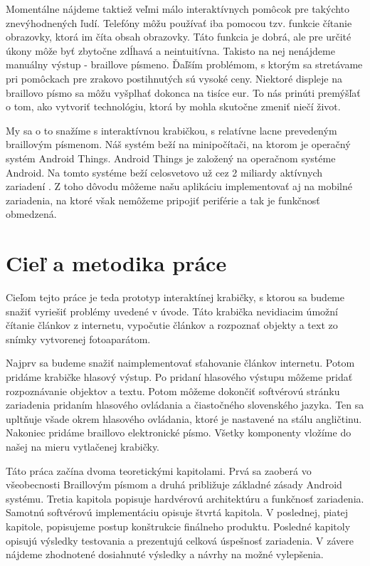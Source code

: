 \documentclass{template/socthesis}
\begin{document}
Momentálne nájdeme taktiež veľmi málo interaktívnych pomôcok pre takýchto znevýhodnených ľudí. Telefóny môžu používať iba pomocou tzv. funkcie čítanie obrazovky, ktorá im číta obsah obrazovky. Táto funkcia je dobrá, ale pre určité úkony môže byť zbytočne zdĺhavá a neintuitívna. Takisto na nej nenájdeme manuálny výstup - braillove písmeno. Ďaľším problémom, s ktorým sa stretávame pri pomôckach pre zrakovo postihnutých sú vysoké ceny. Niektoré displeje na braillovo písmo sa môžu vyšplhať dokonca na tisíce eur. To nás prinúti premýšľať o tom, ako vytvoriť technológiu, ktorá by mohla skutočne zmeniť niečí život.
	
My sa o to snažíme s interaktívnou krabičkou, s relatívne lacne prevedeným braillovým písmenom. Náš systém beží na minipočítači, na ktorom je operačný systém Android Things. Android Things je založený na operačnom systéme Android. Na tomto systéme beží celosvetovo už cez 2 miliardy aktívnych zariadení \cite{ng_2017}. Z toho dôvodu môžeme našu aplikáciu implementovať aj na mobilné zariadenia, na ktoré však nemôžeme pripojiť periférie a tak je funkčnosť obmedzená.
\newpage


\chapter*{Cieľ a metodika práce}
Cieľom tejto práce je teda prototyp interaktínej krabičky, s ktorou sa budeme snažiť vyriešiť problémy uvedené v úvode. Táto krabička nevidiacim úmožní čítanie článkov z internetu, vypočutie článkov a rozpoznať objekty a text zo snímky vytvorenej fotoaparátom.

Najprv sa budeme snažiť naimplementovať sťahovanie článkov internetu. 
Potom pridáme krabičke hlasový výstup. Po pridaní hlasového výstupu môžeme pridať rozpoznávanie objektov a textu. Potom môžeme dokončiť softvérovú stránku zariadenia pridaním hlasového ovládania a čiastočného slovenského jazyka. Ten sa upltňuje všade okrem hlasového ovládania, ktoré je nastavené na stálu angličtinu. Nakoniec pridáme braillovo elektronické písmo. Všetky komponenty vložíme do našej na mieru vytlačenej krabičky.

Táto práca začína dvoma teoretickými kapitolami. Prvá sa zaoberá vo všeobecnosti Braillovým písmom a druhá približuje základné zásady Android systému. Tretia kapitola popisuje hardvérovú architektúru a funkčnosť zariadenia. Samotnú softvérovú implementáciu opisuje štvrtá kapitola. V poslednej, piatej kapitole, popisujeme postup konštrukcie finálneho produktu. Posledné kapitoly opisujú výsledky testovania a prezentujú celková úspešnosť zariadenia. V závere nájdeme zhodnotené dosiahnuté výsledky a návrhy na možné vylepšenia. 
\newpage
\end{document}
